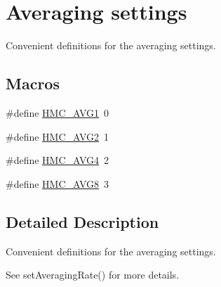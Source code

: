 \hypertarget{group___avg_settings}{\section{Averaging settings}
\label{group___avg_settings}
}


Convenient definitions for the averaging settings.  


\subsection*{Macros}
\begin{DoxyCompactItemize}
\item 
\#define \hyperlink{group___avg_settings_ga0188f97ebf00a8af1cdaa587478d2a90}{H\+M\+C\+\_\+\+A\+V\+G1}~0
\item 
\#define \hyperlink{group___avg_settings_ga2e2164befd111796e1a3bc17823600c5}{H\+M\+C\+\_\+\+A\+V\+G2}~1
\item 
\#define \hyperlink{group___avg_settings_ga07c22d471bceae506c6fbef0d7400dbd}{H\+M\+C\+\_\+\+A\+V\+G4}~2
\item 
\#define \hyperlink{group___avg_settings_gaa0195dbd0cfee3a554bb4464046ba781}{H\+M\+C\+\_\+\+A\+V\+G8}~3
\end{DoxyCompactItemize}


\subsection{Detailed Description}
Convenient definitions for the averaging settings. 

See {\ttfamily set\+Averaging\+Rate()} for more details. 

